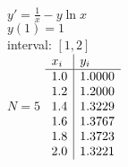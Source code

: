 {
$y' = \displaystyle \frac{1}{x}-y\ln x$\\
$y(1)=1$\\
interval: $[1,2]$\\
$N=5$
}
{
	$\begin{array}{l | l}
		x_i & y_i    \\ \hline
		1.0 & 1.0000 \\
		1.2 & 1.2000 \\
		1.4 & 1.3229 \\
		1.6 & 1.3767 \\
		1.8 & 1.3723 \\
		2.0 & 1.3221 \\
	\end{array}$
}